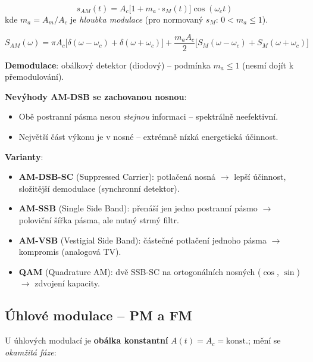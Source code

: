 \documentclass[12pt,a4paper]{article}
\begin{document}
\begin{matBox}
\[
  s_{AM}(t) = A_c\bigl[1 + m_a\cdot s_M(t)\bigr]\cos(\omega_c t)
\]
kde $m_a = A_m/A_c$ je \emph{hloubka modulace} (pro normovaný $s_M$: $0 < m_a \leq 1$).
\end{matBox}

\begin{matBox}
\[
  S_{AM}(\omega) = \pi A_c\bigl[\delta(\omega-\omega_c)+\delta(\omega+\omega_c)\bigr]
  + \frac{m_a A_c}{2}\bigl[S_M(\omega-\omega_c)+S_M(\omega+\omega_c)\bigr]
\]
\end{matBox}

\textbf{Demodulace}: obálkový detektor (diodový) – podmínka $m_a \leq 1$ (nesmí dojít k přemodulování).

\textbf{Nevýhody AM-DSB se zachovanou nosnou}:
\begin{itemize}
  \item Obě postranní pásma nesou \emph{stejnou} informaci – spektrálně neefektivní.
  \item Největší část výkonu je v nosné – extrémně nízká energetická účinnost.
\end{itemize}

\textbf{Varianty}:
\begin{itemize}
  \item \textbf{AM-DSB-SC} (Suppressed Carrier): potlačená nosná $\to$ lepší účinnost, složitější demodulace (synchronní detektor).
  \item \textbf{AM-SSB} (Single Side Band): přenáší jen jedno postranní pásmo $\to$ poloviční šířka pásma, ale nutný strmý filtr.
  \item \textbf{AM-VSB} (Vestigial Side Band): částečné potlačení jednoho pásma $\to$ kompromis (analogová TV).
  \item \textbf{QAM} (Quadrature AM): dvě SSB-SC na ortogonálních nosných ($\cos$, $\sin$) $\to$ zdvojení kapacity.
\end{itemize}

\begin{hvezdBox}
\subsection*{Úhlové modulace – PM a FM}
\end{hvezdBox}

U úhlových modulací je \textbf{obálka konstantní} $A(t) = A_c = \text{konst.}$; mění se \emph{okamžitá fáze}:
\end{document}
